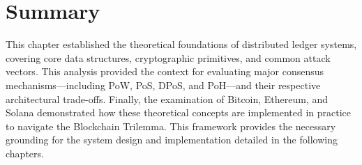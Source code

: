\section{Summary} \label{ch2_summary}

This chapter established the theoretical foundations of distributed ledger systems, covering core data structures, cryptographic primitives, and common attack vectors. This analysis provided the context for evaluating major consensus mechanisms—including PoW, PoS, DPoS, and PoH—and their respective architectural trade-offs. Finally, the examination of Bitcoin, Ethereum, and Solana demonstrated how these theoretical concepts are implemented in practice to navigate the Blockchain Trilemma. This framework provides the necessary grounding for the system design and implementation detailed in the following chapters.